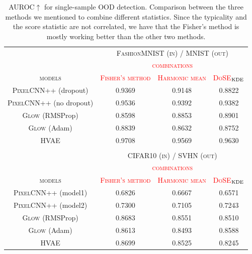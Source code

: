{\begin{table}[tb]
    \centering
    \caption[AUROC$\uparrow$ for single-sample OOD detection comparing three methods of combining different statistics with models trained on FashionMNIST (tested on MNIST) and CIFAR10 (tested on SVHN).]{AUROC$\uparrow$ for single-sample OOD detection. Comparison between the three methods we mentioned to combine different statistics. Since the typicality and the score statistic are not correlated, we have that the Fisher's method is mostly working better than the other two methods.}
        \scriptsize
        \begin{tabular}{cccc}
            \toprule
            &\multicolumn{3}{c}{\textsc{FashionMNIST (in) / MNIST (out)}}\\
            \cmidrule{2-4}
            & \multicolumn{3}{c}{\textcolor{red}{\textsc{combinations}}}\\
            \cmidrule{2-4}
            \textsc{models}  & \textcolor{red}{\textsc{Fisher's method}} & \textcolor{red}{\textsc{Harmonic mean}} &  \textcolor{red}{\textsc{DoSE$_{\textup{KDE}}$}}  \\
            \midrule
            \textsc{PixelCNN++} (dropout) & 0.9369 & 0.9148 & 0.8822 \\
            \textsc{PixelCNN++} (no dropout)  & 0.9536 & 0.9392 & 0.9382\\
            \textsc{Glow} (RMSProp) &  0.8598 & 0.8853 &  0.8901\\
            \textsc{Glow} (Adam)  & 0.8839 & 0.8632 & 0.8752\\
            \textsc{HVAE}  & 0.9708 &  0.9569 & 0.9630\\
            \bottomrule
            & & &  \\
            \toprule
            & \multicolumn{3}{c}{\textsc{CIFAR10 (in) / SVHN (out)}}\\
            \cmidrule{2-4}
            & \multicolumn{3}{c}{\textcolor{red}{\textsc{combinations}}}\\
            \cmidrule{2-4}
            \textsc{models}  & \textcolor{red}{\textsc{Fisher's method}} & \textcolor{red}{\textsc{Harmonic mean}} &  \textcolor{red}{\textsc{DoSE$_{\textup{KDE}}$}}  \\
            \midrule
        
            \textsc{PixelCNN++} (model1)  & 0.6826 & 0.6667 & 0.6571  \\
            \textsc{PixelCNN++} (model2) & 0.7300 & 0.7105 & 0.7243 \\
            \textsc{Glow} (RMSProp)  &  0.8683 & 0.8551 & 0.8510\\
            \textsc{Glow} (Adam) & 0.8613 & 0.8493 & 0.8588  \\
            \textsc{HVAE}  & 0.8699 &  0.8525 & 0.8245 \\
            \bottomrule
        \end{tabular}
        \label{tab_modelagnostic:all_combinations}
\end{table}

}
